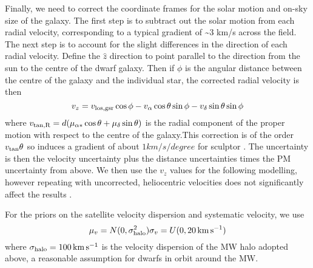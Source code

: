 Finally, we need to correct the coordinate frames for the solar motion
and on-sky size of the galaxy. The first step is to subtract out the
solar motion from each radial velocity, corresponding to a typical
gradient of \textasciitilde3 km/s across the field. The next step is to
account for the slight differences in the direction of each radial
velocity. Define the \(\hat z\) direction to point parallel to the
direction from the sun to the centre of the dwarf galaxy. Then if
\(\phi\) is the angular distance between the centre of the galaxy and
the individual star, the corrected radial velocity is then \[
v_z = v_{\rm los, gsr}\cos\phi  - v_{\alpha}\cos\theta \sin\phi - v_\delta \sin\theta\sin\phi
\] where
\(v_{\rm tan, R} = d(\mu_{\alpha*}\cos\theta + \mu_\delta \sin \theta)\)
is the radial component of the proper motion with respect to the centre
of the galaxy.This correction is of the order \(v_{\rm tan}\theta\) so
induces a gradient of about \(1 km/s/degree\) for sculptor
\citep[see][]{WMO2008}. The uncertainty is then the velocity uncertainty
plus the distance uncertainties times the PM uncertainty from above. We
then use the \(v_z\) values for the following modelling, however
repeating with uncorrected, heliocentric velocities does not
significantly affect the results .

For the priors on the satellite velocity dispersion and systematic
velocity, we use \[
\mu_{v} = N(0, \sigma_{\rm halo}^2) \\
\sigma_{v} = U(0, 20\,{\rm km\,s^{-1}})
\] where \(\sigma_{\rm halo} = 100\,{\rm km\,s^{-1}}\) is the velocity
dispersion of the MW halo adopted above, a reasonable assumption for
dwarfs in orbit around the MW.

\subsection{}\label{section}

